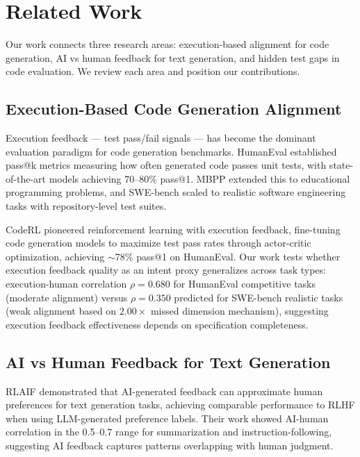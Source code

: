 \section{Related Work}

Our work connects three research areas: execution-based alignment for code generation, AI vs human feedback for text generation, and hidden test gaps in code evaluation. We review each area and position our contributions.

\subsection{Execution-Based Code Generation Alignment}

Execution feedback --- test pass/fail signals --- has become the dominant evaluation paradigm for code generation benchmarks. HumanEval \cite{chen2021evaluating} established pass@k metrics measuring how often generated code passes unit tests, with state-of-the-art models achieving 70--80\% pass@1. MBPP \cite{austin2021program} extended this to educational programming problems, and SWE-bench \cite{jimenez2023swe} scaled to realistic software engineering tasks with repository-level test suites.

CodeRL \cite{le2022coderl} pioneered reinforcement learning with execution feedback, fine-tuning code generation models to maximize test pass rates through actor-critic optimization, achieving $\sim$78\% pass@1 on HumanEval. Our work tests whether execution feedback quality as an intent proxy generalizes across task types: execution-human correlation $\rho=0.680$ for HumanEval competitive tasks (moderate alignment) versus $\rho=0.350$ predicted for SWE-bench realistic tasks (weak alignment based on $2.00\times$ missed dimension mechanism), suggesting execution feedback effectiveness depends on specification completeness.

\subsection{AI vs Human Feedback for Text Generation}

RLAIF \cite{lee2023rlaif} demonstrated that AI-generated feedback can approximate human preferences for text generation tasks, achieving comparable performance to RLHF when using LLM-generated preference labels. Their work showed AI-human correlation in the 0.5--0.7 range for summarization and instruction-following, suggesting AI feedback captures patterns overlapping with human judgment.

